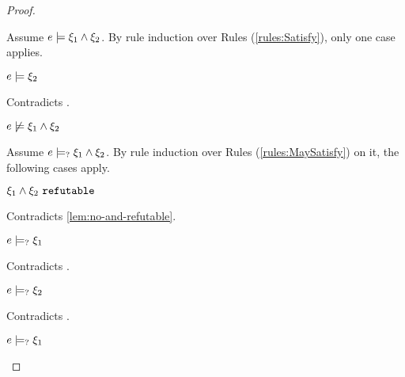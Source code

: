 \begin{proof}
\begin{byCases}
\begin{byCases}
\begin{pfsteps*}
        \end{pfsteps*}
        Assume $e \models \xi_1 \wedge \xi_2$. By rule induction over Rules (\ref{rules:Satisfy}), only one case applies.
        \begin{byCases}
        \item[\text{(\ref{rule:CSAnd})}]
            \begin{pfsteps*}
            \item $e \models \xi_2$ 
            \end{pfsteps*}
            Contradicts .
        \end{byCases}
        \begin{pfsteps*}
        \item $e \not\models \xi_1 \wedge \xi_2$  
        \end{pfsteps*}
        Assume $e \models_{?} \xi_1 \wedge \xi_2$. By rule induction over Rules (\ref{rules:MaySatisfy}) on it, the following cases apply.
        \begin{byCases}
        \item[\text{(\ref{rule:CMSNotVal})}]
            \begin{pfsteps*}
            \item $\xi_1 \wedge \xi_2 ~\mathtt{refutable}$ 
            \end{pfsteps*}
            Contradicts \autoref{lem:no-and-refutable}.
        \item[\text{(\ref{rule:CMSAnd1})}]
            \begin{pfsteps*}
            \item $e \models_{?} \xi_1$ 
            \end{pfsteps*}
            Contradicts .
        \item[\text{(\ref{rule:CMSAnd2})}]
            \begin{pfsteps*}
            \item $e \models_{?} \xi_2$ 
            \end{pfsteps*}
            Contradicts .
        \item[\text{(\ref{rule:CMSAnd3})}]
            \begin{pfsteps*}
            \item $e \models_{?} \xi_1$ 

\end{pfsteps*}
\end{byCases}
\end{byCases}
\end{byCases}
\end{proof}
